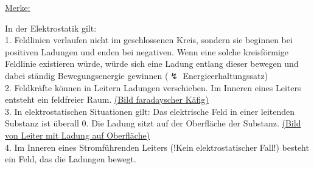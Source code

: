 \vspace{2mm}
\underline{Merke:}

In der Elektrostatik gilt: \\
1. Feldlinien verlaufen nicht im geschlossenen Kreis, sondern sie beginnen bei positiven Ladungen und enden bei negativen. Wenn eine solche kreisförmige Feldlinie existieren würde, würde sich eine Ladung entlang dieser bewegen und dabei ständig Bewegungsenergie gewinnen ($ \lightning $ Energieerhaltungssatz) \\
2. Feldkräfte können in Leitern Ladungen verschieben. Im Inneren eines Leiters entsteht ein feldfreier Raum. \underline{(Bild faradayscher Käfig)} \\
3. In elektrostatischen Situationen gilt: Das elektrische Feld in einer leitenden Substanz ist überall 0. Die Ladung sitzt auf der Oberfläche der Substanz. \underline{(Bild von Leiter mit Ladung auf Oberfläche)} \\
4. Im Inneren eines Stromführenden Leiters (!Kein elektrostatischer Fall!) besteht ein Feld, das die Ladungen bewegt. 

\vspace{10mm}

